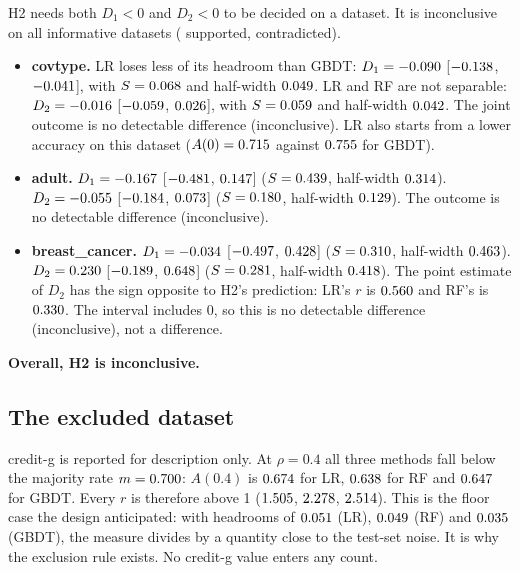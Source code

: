 \documentclass[11pt]{article}
\newcommand{\ds}[1]{\textsf{#1}}
\newcommand{\bc}{\ds{breast\_cancer}}
\newcommand{\cg}{\ds{credit-g}}
\newcommand{\ad}{\ds{adult}}
\newcommand{\ct}{\ds{covtype}}
\begin{document}
H2 needs both $D_1<0$ and $D_2<0$ to be decided on a dataset. It is inconclusive on all
\HTwoNInf{} informative datasets (\HTwoNSup{} supported, \HTwoNCon{} contradicted).
\begin{itemize}
  \item \textbf{\ct.} LR loses less of its headroom than GBDT: $D_1 = -0.090$
  [$-0.138$, $-0.041$], with $S = 0.068$ and half-width
  $0.049$. LR and RF are not separable: $D_2 = -0.016$
  [$-0.059$, $0.026$], with $S = 0.059$ and half-width
  $0.042$. The joint outcome is no detectable difference (inconclusive). LR also
  starts from a lower accuracy on this dataset ($A(0) = 0.715$ against $0.755$
  for GBDT).
  \item \textbf{\ad.} $D_1 = -0.167$ [$-0.481$, $0.147$] ($S =
  0.439$, half-width $0.314$). $D_2 = -0.055$ [$-0.184$,
  $0.073$] ($S = 0.180$, half-width $0.129$). The outcome is no
  detectable difference (inconclusive).
  \item \textbf{\bc.} $D_1 = -0.034$ [$-0.497$, $0.428$] ($S =
  0.310$, half-width $0.463$). $D_2 = 0.230$ [$-0.189$,
  $0.648$] ($S = 0.281$, half-width $0.418$). The point estimate of
  $D_2$ has the sign opposite to H2's prediction: LR's $r$ is $0.560$ and RF's is $0.330$.
  The interval includes 0, so this is no detectable difference (inconclusive), not a
  difference.
\end{itemize}
\textbf{Overall, H2 is inconclusive.}

\subsection{The excluded dataset}

\cg{} is reported for description only. At $\rho=0.4$ all three methods fall below the
majority rate $m = 0.700$: $A(0.4)$ is $0.674$ for LR, $0.638$ for RF and
$0.647$ for GBDT. Every $r$ is therefore above 1 ($1.505$, $2.278$, $2.514$). This is
the floor case the design anticipated: with headrooms of $0.051$ (LR), $0.049$ (RF)
and $0.035$ (GBDT), the measure divides by a
quantity close to the test-set noise. It is why the exclusion rule exists. No \cg{} value
enters any count.

\end{document}
